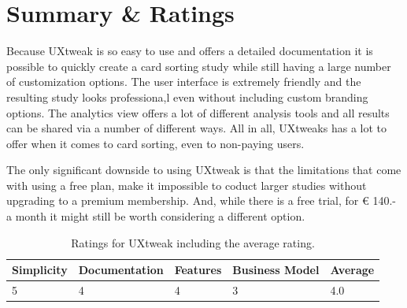 \section{Summary \& Ratings}
Because UXtweak is so easy to use and offers a detailed documentation it is 
possible to quickly create a card sorting study while still having a large 
number of customization options. The user interface is extremely friendly 
and the resulting study looks professiona,l even without including custom 
branding options. The analytics view offers a lot of different analysis tools 
and all results can be shared via a number of different ways. All in all, 
UXtweaks has a lot to offer when it comes to card sorting, even to non-paying 
users.

The only significant downside to using UXtweak is that the limitations that come
with using a free plan, make it impossible to coduct larger studies without 
upgrading to a premium membership. And, while there is a free trial, for € 140.-
a month it might still be worth considering a different option.


\begin{table}[tp] 
\centering 
\begin{tabularx}{\linewidth}{|X|X|X|X|X|}
\hline
Simplicity & Documentation & Features & Business Model & Average \\ 
\hline 
5 & 4 & 4 & 3 & 4.0 \\ 
\hline 
\end{tabularx} 
\caption[Ratings for UXtweak] {
Ratings for UXtweak including the average rating.
} 
\label{tab:rating-UXtweak}
\end{table}





